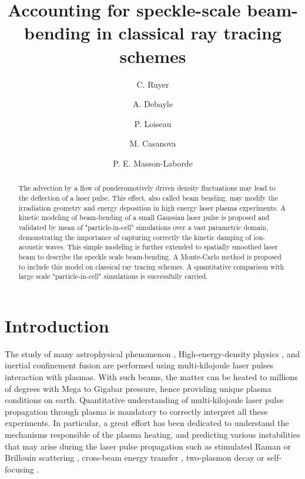 \documentclass[%
 reprint,
 amsmath,amssymb,
 aps,
]{revtex4-1}
\begin{document}
\title{Accounting for speckle-scale beam-bending in classical ray tracing schemes}
\author{C. Ruyer}
\author{A. Debayle}
\author{P. Loiseau}
\author{M. Casanova}
\author{P. E. Masson-Laborde}

\begin{abstract}
The advection by a flow of ponderomotively  driven density fluctuations may lead to the deflection of a laser pulse. This effect,  also called beam bending, may modify the irradiation geometry and energy deposition in high energy laser plasma experiments. A kinetic modeling of beam-bending of a small Gaussian laser pulse is proposed and validated by mean of "particle-in-cell" simulations over a vast parametric domain, demonstrating the importance of capturing correctly the kinetic damping of ion-acoustic waves. This simple modeling is further extended to spatially smoothed laser beam to describe the speckle scale beam-bending. A Monte-Carlo method is proposed to include this model on classical ray tracing schemes. A quantitative comparison with large scale "particle-in-cell" simulations is successfully carried. 
\end{abstract}

\maketitle

\section{Introduction}
The study of many astrophysical phenomenon \cite{Drake_2012}, High-energy-density physics \cite{Drake2006}, and inertial confinement fusion \cite{Lindl_2004,He_2007,Cavailler_2005} are performed using multi-kilojoule laser pulses interaction with plasmas. With such beams, the matter can be heated to millions of degrees with Mega to Gigabar pressure, hence providing unique plasma conditions on earth. Quantitative understanding of 
multi-kilojoule laser pulse propagation through plasma is mandatory to correctly interpret all these experiments. In particular, a great effort has been dedicated to understand the mechanisms responsible of the plasma heating,  and  predicting various instabilities that may arise during the laser pulse propagation such as stimulated Raman or Brillouin scattering  \cite{Shen_1965,Forslund_1973,POP_Liu_2009,hao_2013}, cross-beam energy transfer \cite{hao_2016}, two-plasmon decay  \cite{Dubois_1995,Russell_2001} or self-focusing  \cite{Wagner_1968}.
\end{document}
